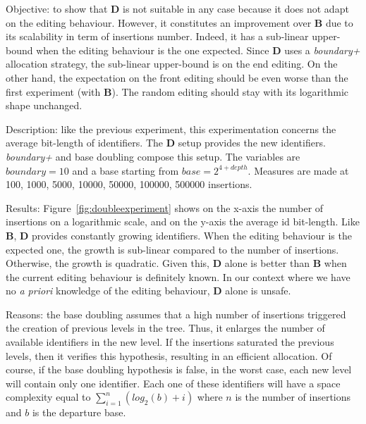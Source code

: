 \begin{asparadesc}
 \item[Objective:] to show that \textbf{D} is not suitable in any case because
   it does not adapt on the editing behaviour.  However, it constitutes an
   improvement over \textbf{B} due to its scalability in term of insertions
   number.  Indeed, it has a sub-linear upper-bound when the editing behaviour
   is the one expected. Since \textbf{D} uses a \emph{boundary+} allocation
   strategy, the sub-linear upper-bound is on the end editing. On the other
   hand, the expectation on the front editing should be even worse than the
   first experiment (with \textbf{B}). The random editing should stay with its
   logarithmic shape unchanged.

\item[Description:] like the previous experiment, this experimentation concerns
  the average bit-length of identifiers. The \textbf{D} setup provides the new
  identifiers.  \emph{boundary+} and base doubling compose this setup. The
  variables are $boundary=10$ and a base starting from
  $base=2^{4+depth}$. Measures are made at 100, 1000, 5000, 10000, 50000,
  100000, 500000 insertions.

\item[Results:] Figure~\ref{fig:doubleexperiment} shows on the x-axis the
  number of insertions on a logarithmic scale, and on the y-axis the average id
  bit-length. Like \textbf{B}, \textbf{D} provides constantly growing
  identifiers. When the editing behaviour is the expected one, the growth is
  sub-linear compared to the number of insertions. Otherwise, the growth is
  quadratic. Given this, \textbf{D} alone is better than \textbf{B} when the
  current editing behaviour is definitely known. In our context where we have
  no \emph{a priori} knowledge of the editing behaviour, \textbf{D} alone is
  unsafe.

\item[Reasons:] the base doubling assumes that a high number of insertions
  triggered the creation of previous levels in the tree. Thus, it enlarges the
  number of available identifiers in the new level. If the insertions saturated
  the previous levels, then it verifies this hypothesis, resulting in an
  efficient allocation. Of course, if the base doubling hypothesis is false, in
  the worst case, each new level will contain only one identifier. Each one of
  these identifiers will have a space complexity equal to
  $\sum\limits_{i=1}^{n}{(log_2(b) + i)}$ where $n$ is the number of insertions
  and $b$ is the departure base.
\end{asparadesc}

